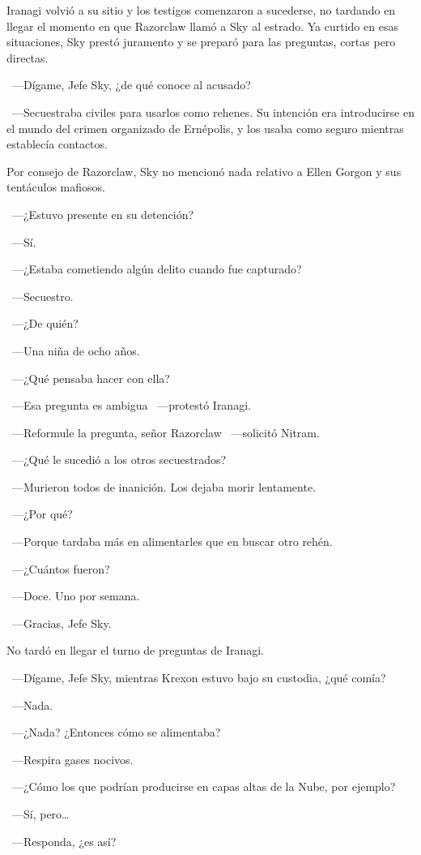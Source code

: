 Iranagi volvió a su sitio y los testigos comenzaron a sucederse, no tardando en llegar el momento en que Razorclaw llamó a Sky al estrado. Ya curtido en esas situaciones, Sky prestó juramento y se preparó para las preguntas, cortas pero directas.

~---Dígame, Jefe Sky, ¿de qué conoce al acusado?

~---Secuestraba civiles para usarlos como rehenes. Su intención era introducirse en el mundo del crimen organizado de Ernépolis, y los usaba como seguro mientras establecía contactos.

Por consejo de Razorclaw, Sky no mencionó nada relativo a Ellen Gorgon y sus tentáculos mafiosos.

~---¿Estuvo presente en su detención?

~---Sí.

~---¿Estaba cometiendo algún delito cuando fue capturado?

~---Secuestro.

~---¿De quién?

~---Una niña de ocho años.

~---¿Qué pensaba hacer con ella?

~---Esa pregunta es ambigua ~---protestó Iranagi.

~---Reformule la pregunta, señor Razorclaw ~---solicitó Nitram.

~---¿Qué le sucedió a los otros secuestrados?

~---Murieron todos de inanición. Los dejaba morir lentamente.

~---¿Por qué?

~---Porque tardaba más en alimentarles que en buscar otro rehén.

~---¿Cuántos fueron?

~---Doce. Uno por semana.

~---Gracias, Jefe Sky.

No tardó en llegar el turno de preguntas de Iranagi.

~---Dígame, Jefe Sky, mientras Krexon estuvo bajo su custodia, ¿qué comía?

~---Nada.

~---¿Nada? ¿Entonces cómo se alimentaba?

~---Respira gases nocivos.

~---¿Cómo los que podrían producirse en capas altas de la Nube, por ejemplo?

~---Sí, pero\dots

~---Responda, ¿es así?

